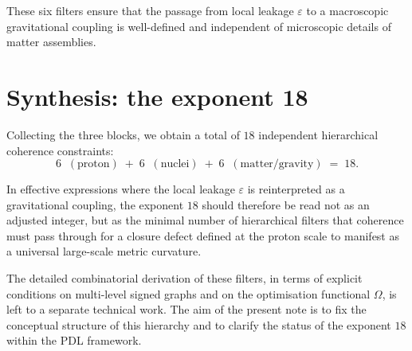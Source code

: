 \documentclass[11pt,a4paper]{article}
\begin{document}
These six filters ensure that the passage from local leakage $\varepsilon$ to
a macroscopic gravitational coupling is well-defined and independent of
microscopic details of matter assemblies.

\section{Synthesis: the exponent 18}

Collecting the three blocks, we obtain a total of $18$ independent hierarchical
coherence constraints:
\[
  6 \;\;(\text{proton}) 
  \;+\; 6 \;\;(\text{nuclei}) 
  \;+\; 6 \;\;(\text{matter/gravity}) 
  \;=\; 18.
\]

In effective expressions where the local leakage $\varepsilon$ is reinterpreted
as a gravitational coupling, the exponent $18$ should therefore be read not as
an adjusted integer, but as the minimal number of hierarchical filters that
coherence must pass through for a closure defect defined at the proton scale
to manifest as a universal large-scale metric curvature.

\medskip

\noindent
The detailed combinatorial derivation of these filters, in terms of explicit
conditions on multi-level signed graphs and on the optimisation functional
$\Omega$, is left to a separate technical work. The aim of the present note is
to fix the conceptual structure of this hierarchy and to clarify the status of
the exponent $18$ within the PDL framework.
\end{document}
